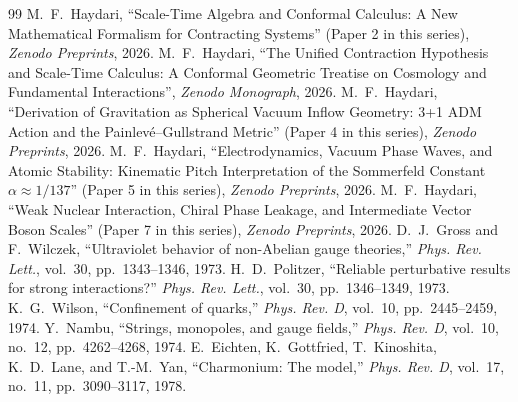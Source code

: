 \documentclass[11pt,a4paper]{article}
\begin{document}
\begin{thebibliography}{99}
     M.~F.~Haydari, ``Scale-Time Algebra and Conformal Calculus: A New Mathematical Formalism for Contracting Systems'' (Paper 2 in this series), \textit{Zenodo Preprints}, 2026.
     M.~F.~Haydari, ``The Unified Contraction Hypothesis and Scale-Time Calculus: A Conformal Geometric Treatise on Cosmology and Fundamental Interactions'', \textit{Zenodo Monograph}, 2026.
     M.~F.~Haydari, ``Derivation of Gravitation as Spherical Vacuum Inflow Geometry: 3+1 ADM Action and the Painlevé--Gullstrand Metric'' (Paper 4 in this series), \textit{Zenodo Preprints}, 2026.
     M.~F.~Haydari, ``Electrodynamics, Vacuum Phase Waves, and Atomic Stability: Kinematic Pitch Interpretation of the Sommerfeld Constant $\alpha \approx 1/137$'' (Paper 5 in this series), \textit{Zenodo Preprints}, 2026.
     M.~F.~Haydari, ``Weak Nuclear Interaction, Chiral Phase Leakage, and Intermediate Vector Boson Scales'' (Paper 7 in this series), \textit{Zenodo Preprints}, 2026.
     D.~J.~Gross and F.~Wilczek, ``Ultraviolet behavior of non-Abelian gauge theories,'' \textit{Phys. Rev. Lett.}, vol.~30, pp.~1343--1346, 1973.
     H.~D.~Politzer, ``Reliable perturbative results for strong interactions?'' \textit{Phys. Rev. Lett.}, vol.~30, pp.~1346--1349, 1973.
     K.~G.~Wilson, ``Confinement of quarks,'' \textit{Phys. Rev. D}, vol.~10, pp.~2445--2459, 1974.
     Y.~Nambu, ``Strings, monopoles, and gauge fields,'' \textit{Phys. Rev. D}, vol.~10, no.~12, pp.~4262--4268, 1974.
     E.~Eichten, K.~Gottfried, T.~Kinoshita, K.~D.~Lane, and T.-M.~Yan, ``Charmonium: The model,'' \textit{Phys. Rev. D}, vol.~17, no.~11, pp.~3090--3117, 1978.
\end{thebibliography}
\end{document}
